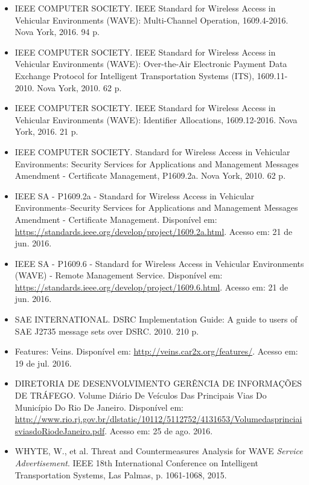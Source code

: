 \documentclass[
12pt,				%
openright,			%
oneside,			%
a4paper,			%
brazil,				%
]{abntex2}
\begin{document}
{\begin{itemize}[label={}]
		\item IEEE COMPUTER SOCIETY. IEEE Standard for Wireless Access in Vehicular Environments (WAVE): Multi-Channel Operation, 1609.4-2016. Nova York, 2016. 94 p.
		
		\item IEEE COMPUTER SOCIETY. IEEE Standard for Wireless Access in Vehicular Environments (WAVE): Over-the-Air Electronic Payment Data Exchange Protocol for Intelligent Transportation Systems (ITS), 1609.11-2010. Nova York, 2010. 62 p.
		
		\item IEEE COMPUTER SOCIETY. IEEE Standard for Wireless Access in Vehicular Environments (WAVE): Identifier Allocations, 1609.12-2016. Nova York, 2016. 21 p.
		
		\item IEEE COMPUTER SOCIETY. Standard for Wireless Access in Vehicular Environments: Security Services for Applications and Management Messages Amendment - Certificate Management, P1609.2a. Nova York, 2010. 62 p.
		
		\item IEEE SA - P1609.2a - Standard for Wireless Access in Vehicular Environments--Security Services for Applications and Management Messages Amendment - Certificate Management. Disponível em: \url{https://standards.ieee.org/develop/project/1609.2a.html}. Acesso em: 21 de jun. 2016.
		
		\item IEEE SA - P1609.6 - Standard for Wireless Access in Vehicular Environments (WAVE) - Remote Management Service. Disponível em: \url{https://standards.ieee.org/develop/project/1609.6.html}. Acesso em: 21 de jun. 2016.
		
		\item SAE INTERNATIONAL. DSRC Implementation Guide: A guide to users of SAE J2735 message sets over DSRC. 2010. 210 p.
		
		\item Features: Veins. Disponível em: \url{http://veins.car2x.org/features/}. Acesso em: 19 de jul. 2016.
		
		\item DIRETORIA DE DESENVOLVIMENTO GERÊNCIA DE INFORMAÇÕES DE TRÁFEGO. Volume Diário De Veículos Das Principais Vias Do Município Do Rio De Janeiro. Disponível em: \url{http://www.rio.rj.gov.br/dlstatic/10112/5112752/4131653/VolumedasprinciaisviasdoRiodeJaneiro.pdf}. Acesso em: 25 de ago. 2016.
		
		\item WHYTE, W., et al. Threat and Countermeasures Analysis for WAVE \textit{Service Advertisement}. IEEE 18th International Conference on Intelligent Transportation Systems, Las Palmas, p. 1061-1068, 2015.
		

\end{itemize}}
\end{document}
